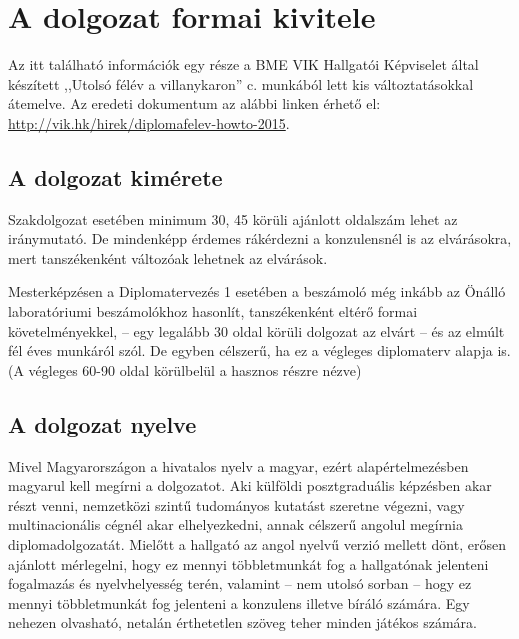 \chapter{A dolgozat formai kivitele}
Az itt található információk egy része a BME VIK Hallgatói Képviselet által készített ,,Utolsó félév a villanykaron'' c. munkából lett kis változtatásokkal átemelve. Az eredeti dokumentum az alábbi linken érhető el: \url{http://vik.hk/hirek/diplomafelev-howto-2015}.

\section{A dolgozat kimérete}
Szakdolgozat esetében minimum 30, 45 körüli ajánlott oldalszám lehet az iránymutató. De mindenképp érdemes rákérdezni a konzulensnél is az elvárásokra, mert tanszékenként változóak lehetnek az elvárások.

Mesterképzésen a Diplomatervezés 1 esetében a beszámoló még inkább az Önálló laboratóriumi beszámolókhoz hasonlít, tanszékenként eltérő formai követelményekkel, -- egy legalább 30 oldal körüli dolgozat az elvárt -- és az elmúlt fél éves munkáról szól. De egyben célszerű, ha ez a végleges diplomaterv alapja is. (A végleges 60-90 oldal körülbelül a hasznos részre nézve)


\section{A dolgozat nyelve}
Mivel Magyarországon a hivatalos nyelv a magyar, ezért alapértelmezésben magyarul kell megírni a dolgozatot. Aki külföldi posztgraduális képzésben akar részt venni, nemzetközi szintű tudományos kutatást szeretne végezni, vagy multinacionális cégnél akar elhelyezkedni, annak célszerű angolul megírnia diplomadolgozatát. Mielőtt a hallgató az angol nyelvű verzió mellett dönt, erősen ajánlott mérlegelni, hogy ez mennyi többletmunkát fog a hallgatónak jelenteni fogalmazás és nyelvhelyesség terén, valamint -- nem utolsó sorban -- hogy ez mennyi többletmunkát fog jelenteni a konzulens illetve bíráló számára. Egy nehezen olvasható, netalán érthetetlen szöveg teher minden játékos számára.

